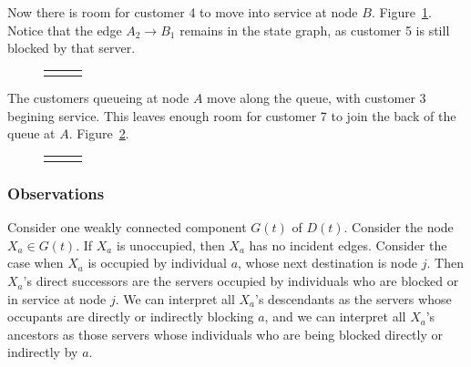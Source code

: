 \documentclass{article}
\begin{document}
Now there is room for customer 4 to move into service at node $B$. Figure~\ref{fig:general_builddown_3}.
Notice that the edge $A_2 \longrightarrow B_1$ remains in the state graph, as customer 5 is still blocked by that server.

\begin{figure}[H]
  \begin{center}
    \begin{tabular}{ c c c }
       & \hspace{0.1\textwidth} &
       \\
  \end{tabular}
  \end{center}
  \caption{}
  \label{fig:general_builddown_3}
\end{figure}

The customers queueing at node $A$ move along the queue, with customer 3 begining service.
This leaves enough room for customer 7 to join the back of the queue at $A$. Figure~\ref{fig:general_builddown_4}.

\begin{figure}[H]
  \begin{center}
    \begin{tabular}{ c c c }
       & \hspace{0.1\textwidth} &
       \\
  \end{tabular}
  \end{center}
  \caption{}
  \label{fig:general_builddown_4}
\end{figure}

\subsubsection*{Observations}

Consider one weakly connected component $G(t)$ of $D(t)$.
Consider the node $X_a \in G(t)$. If $X_a$ is unoccupied, then $X_a$ has no incident edges.
Consider the case when $X_a$ is occupied by individual $a$, whose next destination is node $j$.
Then $X_a$'s direct successors are the servers occupied by individuals who are blocked or in service at node $j$.
We can interpret all $X_a$'s descendants as the servers whose occupants are directly or indirectly blocking $a$, and we can interpret all $X_a$'s ancestors as those servers whose individuals who are being blocked directly or indirectly by $a$.
\end{document}
